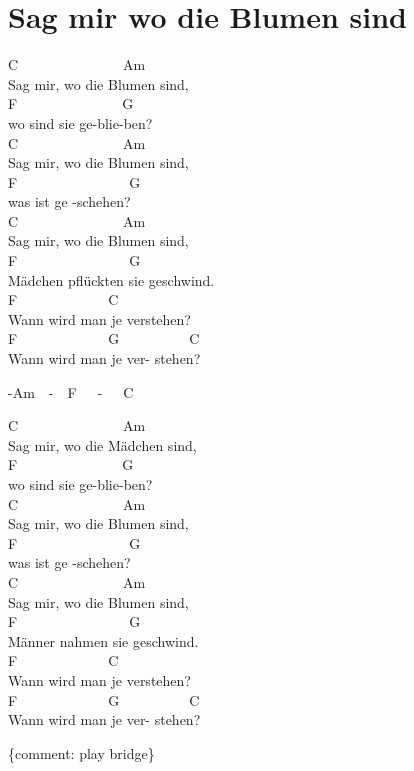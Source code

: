 \documentclass[
  letterpaper,
  a5paper]{memoir}
\begin{document}
\hypertarget{sag-mir-wo-die-blumen-sind}{%
\chapter{Sag mir wo die Blumen sind}\label{sag-mir-wo-die-blumen-sind}}

C~~~~~~~~~~~~~~~Am~~~~~~~~~~~\\
Sag mir, wo die Blumen sind,\\
F~~~~~~~~~~~~~~~G\\
wo sind sie ge-blie-ben?\\
C~~~~~~~~~~~~~~~Am~~~~~~~~~~~\\
Sag mir, wo die Blumen sind,\\
F~~~~~~~~~~~~~~~~G\\
was ist ge -schehen?\\
C~~~~~~~~~~~~~~~Am~~~~~~~~~~~\\
Sag mir, wo die Blumen sind,\\
F~~~~~~~~~~~~~~~~G\\
Mädchen pflückten sie geschwind.\\
F~~~~~~~~~~~~~C~~~~~~~~~~~~~~~~~\\
Wann wird man je verstehen?~~~~~\\
F~~~~~~~~~~~~~G~~~~~~~~~~C\\
Wann wird man je ver- stehen?

-Am~~-~~F~~~-~~~C

C~~~~~~~~~~~~~~~Am~~~~~~~~~~~\\
Sag mir, wo die Mädchen sind,\\
F~~~~~~~~~~~~~~~G\\
wo sind sie ge-blie-ben?\\
C~~~~~~~~~~~~~~~Am~~~~~~~~~~~\\
Sag mir, wo die Blumen sind,\\
F~~~~~~~~~~~~~~~~G\\
was ist ge -schehen?\\
C~~~~~~~~~~~~~~~Am~~~~~~~~~~~\\
Sag mir, wo die Blumen sind,\\
F~~~~~~~~~~~~~~~~G\\
Männer nahmen sie geschwind.\\
F~~~~~~~~~~~~~C~~~~~~~~~~~~~~~~~\\
Wann wird man je verstehen?~~~~~\\
F~~~~~~~~~~~~~G~~~~~~~~~~C\\
Wann wird man je ver- stehen?

\{comment: play bridge\}
\end{document}
